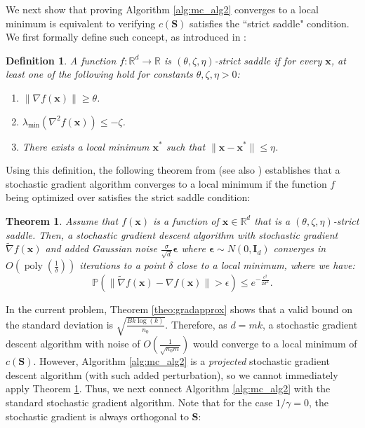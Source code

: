 \documentclass[twoside,11pt]{article}
\newcommand{\md}[1]{\mathbb{#1}}
\renewcommand{\P}{\mathbb{P}}
\newtheorem{theo}{Theorem}
\newtheorem{defi}{Definition}
\renewcommand{\P}{\mathbb{P}}
\DeclareMathOperator\poly{poly}
\begin{document}
We next  show that proving Algorithm  \ref{alg:mc_alg2} converges to a local minimum is equivalent to verifying $c(\bm{S})$ satisfies the ``strict saddle" condition. We first formally define such concept, as introduced in \cite{ge2015escaping}:
\begin{defi}
	A function $f: \md{R}^d \to \md{R}$  is $(\theta, \zeta, \eta)$-strict saddle if for every $\bm{x}$, at least one of the following hold for constants $\theta, \zeta, \eta>0$:
	\begin{enumerate}
		\item $\|\nabla f(\bm{x})\|\geq \theta$.
		\item $\lambda_{\text{min}}(\nabla^2f(\bm{x}))\leq -\zeta$.
		\item There exists a local minimum $\bm{x}^*$ such that $\|\bm{x}-\bm{x}^*\|\leq \eta$. 
	\end{enumerate}
\end{defi} 
Using this definition, the following theorem from  \cite{fang2019sharp} (see also \cite{daneshmand2018escaping,ge2015escaping}) establishes that a stochastic gradient algorithm converges to a local minimum if the function $f$ being optimized over satisfies the strict saddle condition:
\begin{theo}
	\label{theo:gdconverge}
	Assume that  $f(\bm{x})$ is a function of $\bm{x} \in \md{R}^d$ that is a $(\theta, \zeta, \eta)$-strict saddle. Then, a stochastic gradient descent algorithm  with stochastic gradient $\tilde{\nabla} f(\bm{x})$ and added Gaussian noise $\frac{\sigma}{\sqrt{d}}\bm{\epsilon}$ where $\bm{\epsilon} \sim N(0,\bm{I}_d)$ converges in $O\left(\poly\left(\frac{1}{\delta}\right)\right)$ iterations to a point $\delta$ close to a local minimum, where we have:
    \begin{equation*}
\P(\|\tilde{\nabla} f(\bm{x})-\nabla f(\bm{x})\|>\epsilon)\leq e^{-\frac{\epsilon^2}{2\sigma^2}}   .
\end{equation*}\end{theo}
In the current problem,  Theorem \ref{theo:gradapprox} shows that a valid bound on the standard deviation is $\sqrt{\frac{Bk\log(k)}{n_0}}$. Therefore, as $d=mk$, a stochastic gradient descent algorithm with noise of $O(\frac{1}{\sqrt{n_0m}})$ would converge to a local minimum of $c(\bm{S})$. However,  Algorithm \ref{alg:mc_alg2} is a \emph{projected} stochastic gradient descent algorithm (with such added perturbation), so we cannot immediately apply Theorem \ref{theo:gdconverge}. Thus, we next  connect Algorithm \ref{alg:mc_alg2} with the standard stochastic gradient algorithm. Note that for the case $1/\gamma=0$, the stochastic gradient is always orthogonal to $\bm{S}$:
\end{document}
